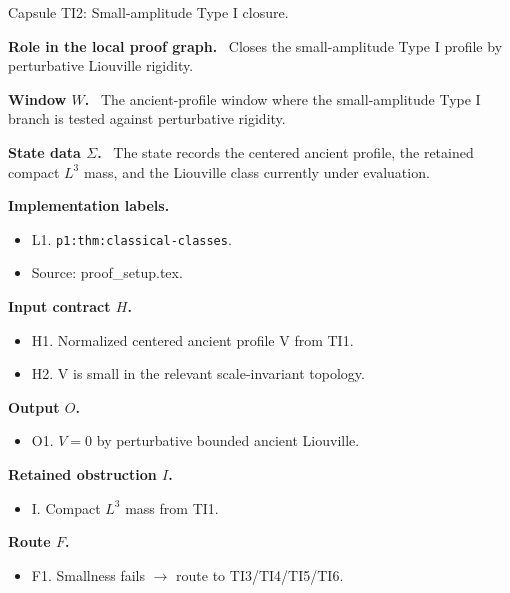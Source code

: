 \documentclass[11pt]{amsart}
\newcommand{\capsulefield}[1]{\par\smallskip\noindent\textbf{#1.}\ }
\begin{document}
\begin{proofcapsule}{Capsule TI2: Small-amplitude Type I closure.}
  \capsulefield{Role in the local proof graph}
  Closes the small-amplitude Type I profile by perturbative Liouville rigidity.

  \capsulefield{Window \(W\)}
The ancient-profile window where the small-amplitude Type I branch is tested against perturbative rigidity.

  \capsulefield{State data \(\Sigma\)}
The state records the centered ancient profile, the retained compact $L^3$ mass, and the Liouville class currently under evaluation.

  \capsulefield{Implementation labels}
  \begin{itemize}[leftmargin=1.8em]
  \item L1. \texttt{p1:thm:classical-classes}.
  \item Source: proof\_setup.tex.
  \end{itemize}

  \capsulefield{Input contract \(H\)}
  \begin{itemize}[leftmargin=1.8em]
  \item H1. Normalized centered ancient profile V from TI1.
  \item H2. V is small in the relevant scale-invariant topology.
  \end{itemize}

  \capsulefield{Output \(O\)}
  \begin{itemize}[leftmargin=1.8em]
  \item O1. \(V=0\) by perturbative bounded ancient Liouville.
  \end{itemize}

  \capsulefield{Retained obstruction \(I\)}
  \begin{itemize}[leftmargin=1.8em]
  \item I. Compact $L^3$ mass from TI1.
  \end{itemize}

  \capsulefield{Route \(F\)}
  \begin{itemize}[leftmargin=1.8em]
  \item F1. Smallness fails $\to$ route to TI3/TI4/TI5/TI6.
  \end{itemize}


\end{proofcapsule}
\end{document}
